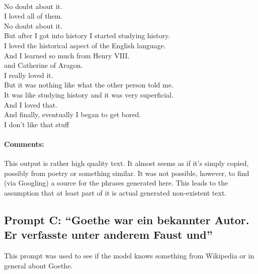 \documentclass{scrartcl}
\begin{document}
{\\
No doubt about it.
\\
I loved all of them.
\\
No doubt about it.
\\
But after I got into history I started studying history.
\\
I loved the historical aspect of the English language.
\\
And I learned so much from Henry VIII.
\\
and Catherine of Aragon.
\\
I really loved it.
\\
But it was nothing like what the other person told me.
\\
It was like studying history and it was very superficial.\\
And I loved that.
\\
And finally, eventually I began to get bored.
\\
I don't like that stuff
}

\paragraph{Comments:} 
This output is rather high quality text. It almost seems as if it's simply copied, possibly from poetry or something similar. It was not possible, however, to find (via Googling) a source for the phrases generated here. This leads to the assumption that at least part of it is actual generated non-existent text.

\subsection{Prompt C: \enquote{Goethe war ein bekannter Autor. Er verfasste unter anderem Faust und}}
This prompt was used to see if the model knows something from Wikipedia or in general about Goethe.
\end{document}
